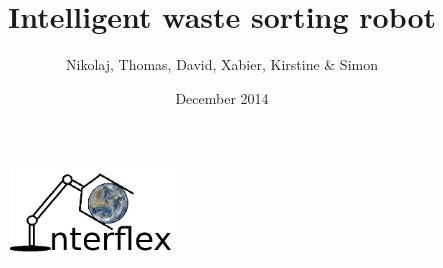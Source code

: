 \begin{titlepage}


\title{Intelligent waste sorting robot}
\author{Nikolaj, Thomas, David, Xabier, Kirstine \& Simon }
\date{December 2014}

\begin{figure}[b]
\centering
\includegraphics[width=0.4\textwidth]{graphics/logo.png}
\end{figure}

\vfill
\end{titlepage}
\maketitle
